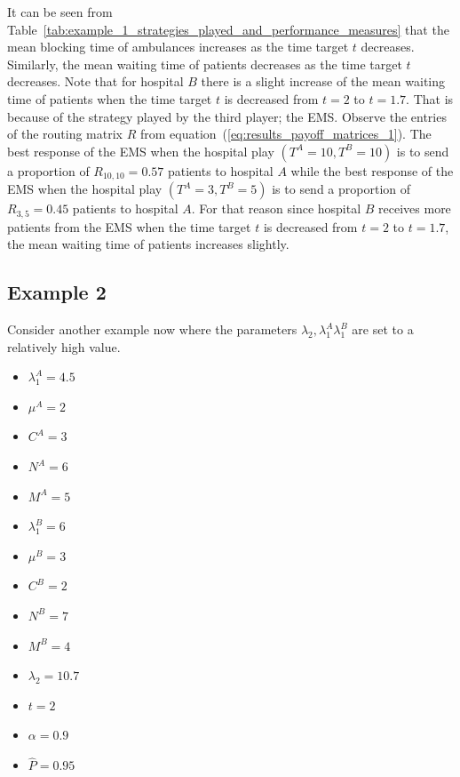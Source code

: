 It can be seen from
Table~\ref{tab:example_1_strategies_played_and_performance_measures} that the
mean blocking time of ambulances increases as the time target \(t\) decreases.
Similarly, the mean waiting time of patients decreases as the time target \(t\)
decreases.
Note that for hospital \(B\) there is a slight increase of the mean waiting time
of patients when the time target \(t\) is decreased from \(t = 2\) to
\(t = 1.7\).
That is because of the strategy played by the third player; the EMS.
Observe the entries of the routing matrix \(R\) from
equation~(\ref{eq:results_payoff_matrices_1}).
The best response of the EMS when the hospital play \((T^A=10, T^B=10)\) is
to send a proportion of \(R_{10, 10} = 0.57\) patients to hospital \(A\)
while the best response of the EMS when the hospital play \((T^A=3, T^B=5)\)
is to send a proportion of \(R_{3, 5} = 0.45\) patients to hospital \(A\).
For that reason since hospital \(B\) receives more patients from the EMS when
the time target \(t\) is decreased from \(t = 2\) to \(t = 1.7\), the mean 
waiting time of patients increases slightly.


\subsection{Example 2}

Consider another example now where the parameters \(\lambda_2, \lambda_1^A
\lambda_1^B\) are set to a relatively high value.

\begin{multicols}{3}
    \begin{itemize}
        \item \( \lambda_1^A = 4.5 \)
        \item \( \mu^A = 2 \)
        \item \( C^A = 3 \)
        \item \( N^A = 6 \)
        \item \( M^A = 5 \)
        \columnbreak

        \item \( \lambda_1^B = 6 \)
        \item \( \mu^B = 3 \)
        \item \( C^B = 2 \)
        \item \( N^B = 7 \)
        \item \( M^B = 4 \)
        \columnbreak

        \item \( \lambda_2 = 10.7 \)
        \item \( t = 2 \)
        \item \( \alpha = 0.9 \)
        \item \( \hat{P} = 0.95 \)
    \end{itemize}
\end{multicols}

